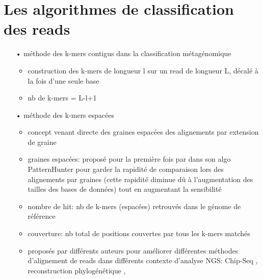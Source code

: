 \section{Les algorithmes de classification des reads}

	\begin{itemize}
		\item[•] méthode des k-mers contigus dans la classification métagénomique
                  \begin{itemize}
                  \item construction des k-mers de longueur l sur un read de longueur L, décalé à la fois d'une seule base
                  \item nb de k-mers = L-l+1
                  \end{itemize}
		\item[•] méthode des k-mers espacées
                  \begin{itemize}
                  \item concept venant directe des graines espacées des alignements par extension de graine
                  \item graines espacées: proposé pour la première fois par \cite{Ma2002} dans son algo PatternHunter pour garder la rapidité de comparaison lors des alignements par graines (cette rapidité diminue dû à l'augmentation des tailles des bases de données) tout en augmentant la sensibilité
                  \item nombre de hit: nb de k-mers (espacées) retrouvés dans le génome de référence
                  \item couverture: nb total de positions couvertes par tous les k-mers matchés
                  \item proposés par différents auteurs pour améliorer différentes méthodes d'alignement de reads dans différents contexte d'analyse NGS: Chip-Seq \cite{Ghandi2014}, reconstruction phylogénétique \cite{Leimeister2014}, 
                  \end{itemize} 
	\end{itemize}